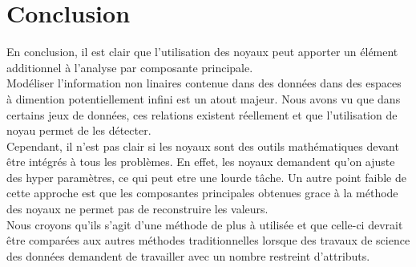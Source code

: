 \section{Conclusion}

En conclusion, il est clair que l'utilisation des noyaux peut apporter un élément additionnel à l'analyse par composante principale.\\

Modéliser l'information non linaires contenue dans des données dans des espaces à dimention potentiellement infini est un atout majeur.
Nous avons vu que dans certains jeux de données, ces relations existent réellement et que l'utilisation de noyau permet de les détecter.\\

Cependant, il n'est pas clair si les noyaux sont des outils mathématiques devant être intégrés à tous les problèmes. 
En effet, les noyaux demandent qu'on ajuste des hyper paramètres, ce qui peut etre une lourde tâche. Un autre point faible de 
cette approche est que les composantes principales obtenues grace à la méthode des noyaux ne permet pas de reconstruire les 
valeurs. \\

Nous croyons qu'ils s'agit d'une méthode de plus à utilisée et que celle-ci devrait être comparées aux autres méthodes
traditionnelles lorsque des travaux de science des données demandent de travailler avec un nombre restreint d'attributs.